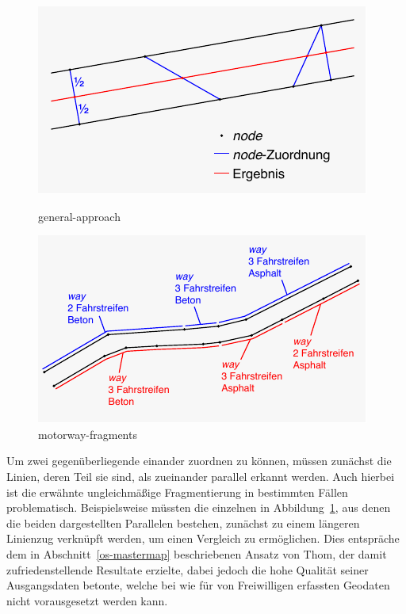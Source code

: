 \documentclass[../main/thesis.tex]{subfiles}
\begin{document}
\begin{figure}[ht]
  \begin{minipage}[t]{.5\linewidth}
    \centering
    \includegraphics[width=\ScaleIfNeeded]{../chapter4/general-approach}
    \caption{general-approach}\label{fig:general-approach}
  \end{minipage}%
  \begin{minipage}[t]{.5\linewidth}
    \centering
    \includegraphics[width=\ScaleIfNeeded]{../chapter4/motorway-fragments}
    \caption{motorway-fragments}\label{fig:motorway-fragments}
  \end{minipage}
\end{figure}

Um zwei gegenüberliegende  einander zuordnen zu können, müssen zunächst die Linien, deren Teil sie sind, als zueinander parallel erkannt werden.
Auch hierbei ist die erwähnte ungleichmäßige Fragmentierung in bestimmten Fällen problematisch.
Beispielsweise müssten die einzelnen  in Abbildung~\ref{fig:motorway-fragments}, aus denen die beiden dargestellten Parallelen bestehen, zunächst zu einem längeren Linienzug verknüpft werden, um einen Vergleich zu ermöglichen.
Dies entspräche dem in Abschnitt~\ref{os-mastermap} beschriebenen Ansatz von Thom, der damit zufriedenstellende Resultate erzielte, dabei jedoch die hohe Qualität seiner Ausgangsdaten betonte, welche bei wie für \osm{} von Freiwilligen erfassten Geodaten nicht vorausgesetzt werden kann.
\end{document}
